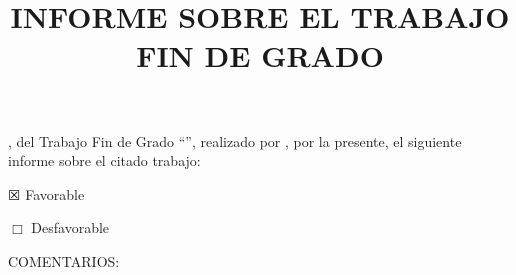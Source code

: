 %

\title{INFORME \MakeUppercase{\mybookDelOrDeLos{} \mybookTutorOrTutores}
  SOBRE EL TRABAJO FIN DE GRADO} 
\date{}                                            %


{\Large
\maketitle 

\thispagestyle{empty}

\vspace{1cm}

\mybookadvisorsConDon, \mybookTutorOrTutores{} del Trabajo Fin de Grado
``\mybooktitle'', realizado por \donOrDonaAutor{} \myAuthorFullName, por la
presente, \mybookEmiteOrEmiten{} el siguiente informe sobre el citado
trabajo:

\vspace{1cm}

$\XBox$ Favorable

\vspace{0.5cm}

$\Box$ Desfavorable

\vspace{1cm}

COMENTARIOS:

\vspace{2cm}


\vspace{4cm}


}


